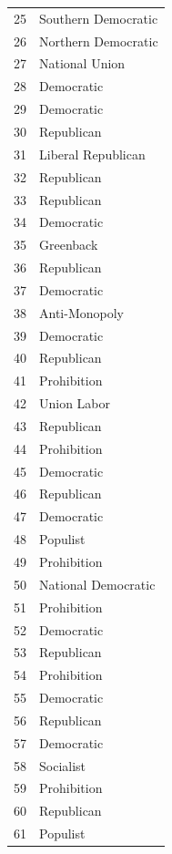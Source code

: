 \documentclass[
  letterpaper,
  DIV=11,
  numbers=noendperiod]{scrreprt}
\begin{document}
\begin{tabular}{ll}
25  &    Southern Democratic \\
26  &    Northern Democratic \\
27  &         National Union \\
28  &             Democratic \\
29  &             Democratic \\
30  &             Republican \\
31  &     Liberal Republican \\
32  &             Republican \\
33  &             Republican \\
34  &             Democratic \\
35  &              Greenback \\
36  &             Republican \\
37  &             Democratic \\
38  &          Anti-Monopoly \\
39  &             Democratic \\
40  &             Republican \\
41  &            Prohibition \\
42  &            Union Labor \\
43  &             Republican \\
44  &            Prohibition \\
45  &             Democratic \\
46  &             Republican \\
47  &             Democratic \\
48  &               Populist \\
49  &            Prohibition \\
50  &    National Democratic \\
51  &            Prohibition \\
52  &             Democratic \\
53  &             Republican \\
54  &            Prohibition \\
55  &             Democratic \\
56  &             Republican \\
57  &             Democratic \\
58  &              Socialist \\
59  &            Prohibition \\
60  &             Republican \\
61  &               Populist \\

\end{tabular}
\end{document}
